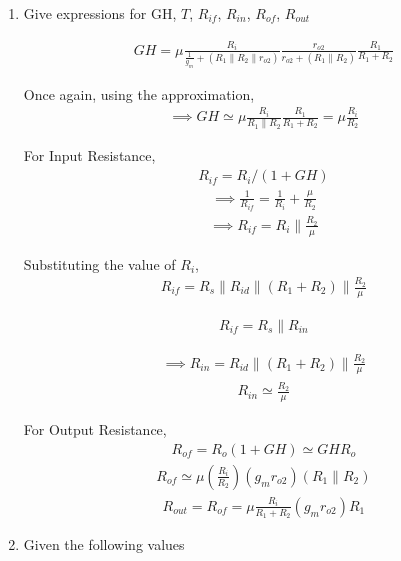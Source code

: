 \begin{enumerate}[label=\thesubsection.\arabic*.,ref=\thesubsection.\theenumi]
\item
Give expressions for GH, $T$, $R_{if}$, $R_{in}$, $R_{of}$, $R_{out}$

\solution
\begin{align}
    GH=\mu \frac{R_{i}}{\frac{1}{g_{m}}+(R_{1}\|R_{2}\| r_{o 2})} \frac{r_{o 2}}{r_{o 2}+(R_{1} \| R_{2})} \frac{R_{1}}{R_{1}+R_{2}}
\end{align}

Once again, using the approximation,
\begin{align}
    \implies GH \simeq \mu \frac{R_{i}}{R_{1} \| R_{2}} \frac{R_{1}}{R_{1}+R_{2}}=\mu \frac{R_{i}}{R_{2}}
\end{align}

For Input Resistance,
\begin{align}
    R_{if}=R_{i} /(1+GH)
\end{align}
\begin{align}
    \implies \frac{1}{R_{i f}}=\frac{1}{R_{i}}+\frac{\mu}{R_{2}}
\end{align}
\begin{align}
    \implies R_{i f}=R_{i} \| \frac{R_{2}}{\mu}
\end{align}

Substituting the value of $R_{i}$,
\begin{align}
    R_{if}=R_{s}\|R_{id}\|(R_{1}+R_{2}) \| \frac{R_{2}}{\mu}
\end{align}

\begin{align}
    R_{if}=R_{s} \| R_{in}
\end{align}

\begin{align}
    \implies R_{in}=R_{i d}\|(R_{1}+R_{2})\| \frac{R_{2}}{\mu}
\end{align}
\begin{align}
    R_{in} \simeq \frac{R_{2}}{\mu}
\end{align}

For Output Resistance,
\begin{align}
    R_{of}=R_{o}(1+GH) \simeq GH R_{o}
\end{align}
\begin{align}
    R_{of} \simeq \mu (\frac{R_{i}}{R_{2}})(g_{m} r_{o 2})(R_{1} \| R_{2})
\end{align}
\begin{align}
    R_{out} = R_{of}=\mu \frac{R_{i}}{R_{1}+R_{2}}(g_{m} r_{o 2}) R_{1}
\end{align}


\item
Given the following values
\begin{table}[!ht]
\centering

\caption{}
\label{table: Input_Table}
\end{table}


\end{enumerate}

